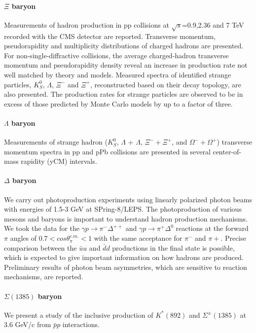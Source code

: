 \documentclass[
10pt, %
a4paper, %
oneside, %
headinclude,footinclude, %
BCOR5mm, %
]{scrartcl}
\begin{document}
\paragraph{$\Xi$ baryon}Measurements of hadron production in pp collisions at $\sqrt{s}$=0.9,2.36 and 7 TeV recorded with the CMS detector are reported. Transverse momentum, pseudorapidity and multiplicity distributions of charged hadrons are presented. For non-single-diffractive collisions, the average charged-hadron transverse momentum and pseudorapidity density reveal an increase in production rate not well matched by theory and models. Measured spectra of identified strange particles, $K^0_S$, $\Lambda$,  $\Xi^-$ and $\Xi^+$, reconstructed based on their decay topology, are also presented. The production rates for strange particles are observed to be in excess of those predicted by Monte Carlo models by up to a factor of three\cite{Ulmer:1313002}.

\paragraph{$\Lambda$ baryon}Measurements of strange hadron ($K^0_S$, $\Lambda$ + $\Lambda$, $\Xi^-+\Xi^+$, and $\Omega^-+\Omega^+$) transverse momentum spectra in pp and pPb collisions are presented in several center-of-mass rapidity (yCM) intervals\cite{CMS-PAS-HIN-16-013}.

\paragraph{$\Delta$ baryon}We carry out photoproduction experiments using linearly polarized photon beams with energies of 1.5-3 GeV at SPring-8/LEPS. The photoproduction of various mesons and baryons is important to understand hadron production mechanisms. We took the data for the $\gamma p\rightarrow\pi^-\Delta^{++}$ and $\gamma p\rightarrow\pi^+\Delta^{0}$ reactions at the forward $\pi$ angles of $0.7<cos\theta_{\pi}^{c.m.}<1$ with the same acceptance for $\pi^-$ and $\pi+$. Precise comparison between the $\bar{u}u$ and $\bar{d}d$ productions in the final state is possible, which is expected to give important information on how hadrons are produced. Preliminary results of photon beam asymmetries, which are sensitive to reaction mechanisms, are reported. \cite{Kohri:2017mfj}

\paragraph{$\Sigma(1385)$ baryon} We present a study of the inclusive production of $K^*(892)$ and $\Sigma^{\pm}(1385)$ at 3.6 GeV/c from $\bar{p}p$ interactions.\cite{Banerjee:170616}
\end{document}
